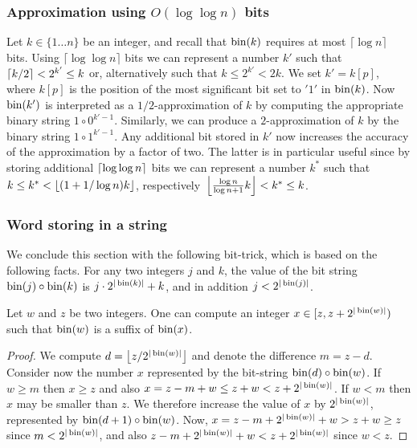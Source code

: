 	\subsubsection{Approximation using $O(\log\log n)$ bits}\label{tec:approx}
	 Let $k \in  \{1 \dots n\}$ be an integer, and recall that  $\operatorname{bin}(k)$ requires at most $\lceil \log n \rceil$ bits. Using $\lceil \log \log n \rceil$ bits we can represent a number $k'$ such that $\left\lceil{k/2}\right\rceil < 2^{k'} \leq k$ or, alternatively such that $k \leq 2^{k'} < 2k$.
	We  set  $k' =  k[p]$,  where $k[p]$ is the position of the most significant bit set to $'1'$ in $\operatorname{bin}(k)$.
	 Now $\operatorname{bin}(k')$ is interpreted as a $1/2$-approximation of $k$  by computing the appropriate  binary string $1 \circ 0^{k'-1}$.
	Similarly, we can produce a $2$-approximation of $k$ by  the  binary string $1 \circ 1^{k'-1}$.
	Any additional bit stored in $k'$ now increases the accuracy of the approximation by a factor of two.
	The latter is in particular useful since by storing  additional  $\left\lceil{ \log \log n }\right\rceil$ bits we can represent a number $k^*$ such that $k \leq k^* < \left\lfloor{(1+1/ \log n)k}\right\rfloor$, respectively~$\left\lfloor{\frac{\log n}{\log n+1}k}\right\rfloor < k^* \leq k$.

\subsubsection{Word storing in a string}\label{tec:wordinside}
	We conclude this section with the following  bit-trick, which is based on the following facts.
	For any two integers $j$ and $k$, the value of the bit string $\operatorname{bin}(j) \circ \operatorname{bin}(k)$ is $j \cdot 2^{\vert\operatorname{bin}(k)\vert}+k$, and in addition $j<2^{\vert \operatorname{bin}(j)\vert}$.
			\begin{lemma} \label{lemma:numberinside}
			Let $w$ and $z$ be two integers. One can compute  an integer $x \in [z,z+2^{ \vert \operatorname{bin}(w) \vert} )$ such that $\operatorname{bin}(w)$ is a suffix of $\operatorname{bin}(x)$.
			\end{lemma}
			\begin{proof}
			 We  compute $d = \left\lfloor{z/ 2^{\vert \operatorname{bin}(w) \vert}}\right\rfloor$ and denote the difference $m = z-d$.
			 Consider now the number $x$ represented by the bit-string $ \operatorname{bin}(d) \circ \operatorname{bin}(w)$.
			 If $w \geq m$  then $x \geq z$ and also   $x=z-m+w \leq z+w < z + 2^{\vert  \operatorname{bin}(w) \vert}$.
			 If $w < m$ then $x$ may be smaller than $z$. 
			 We therefore increase the value of  $x$ by  $2^{\vert \operatorname{bin}(w) \vert}$, represented by  $\operatorname{bin}(d+1) \circ \operatorname{bin}(w)$.	
			 Now, $x = z- m + 2^{\vert  \operatorname{bin}(w) \vert}  + w > z + w \geq z$ since $m< 2^{\vert \operatorname{bin}(w) \vert}$, and also $z-m+ 2^{\vert \operatorname{bin}(w) \vert} +w < z +  2^{\vert \operatorname{bin}(w) \vert}$ since $w<z$. 
			 \end{proof}
			
